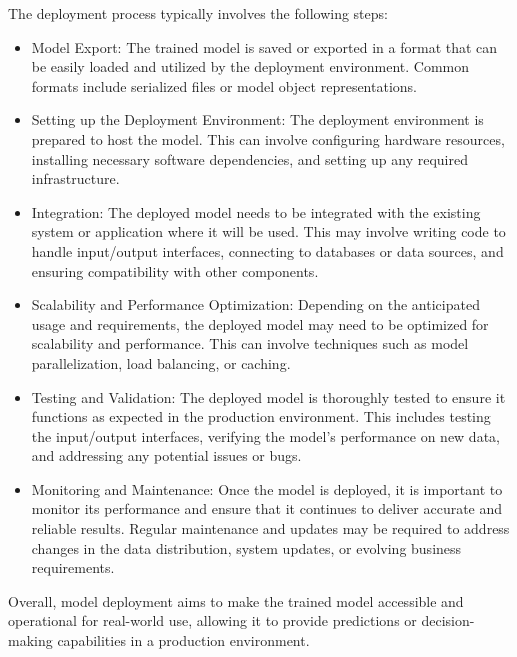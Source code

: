 \documentclass{article}
\begin{document}
The deployment process typically involves the following steps:
\begin{itemize}
    \item Model Export: The trained model is saved or exported in a format that can be easily loaded and utilized by the deployment environment. Common formats include serialized files or model object representations.
    \item Setting up the Deployment Environment: The deployment environment is prepared to host the model. This can involve configuring hardware resources, installing necessary software dependencies, and setting up any required infrastructure.
    \item Integration: The deployed model needs to be integrated with the existing system or application where it will be used. This may involve writing code to handle input/output interfaces, connecting to databases or data sources, and ensuring compatibility with other components.
    \item Scalability and Performance Optimization: Depending on the anticipated usage and requirements, the deployed model may need to be optimized for scalability and performance. This can involve techniques such as model parallelization, load balancing, or caching.
    \item Testing and Validation: The deployed model is thoroughly tested to ensure it functions as expected in the production environment. This includes testing the input/output interfaces, verifying the model's performance on new data, and addressing any potential issues or bugs.
    \item Monitoring and Maintenance: Once the model is deployed, it is important to monitor its performance and ensure that it continues to deliver accurate and reliable results. Regular maintenance and updates may be required to address changes in the data distribution, system updates, or evolving business requirements.
\end{itemize}
Overall, model deployment aims to make the trained model accessible and operational for real-world use, allowing it to provide predictions or decision-making capabilities in a production environment.
\end{document}
